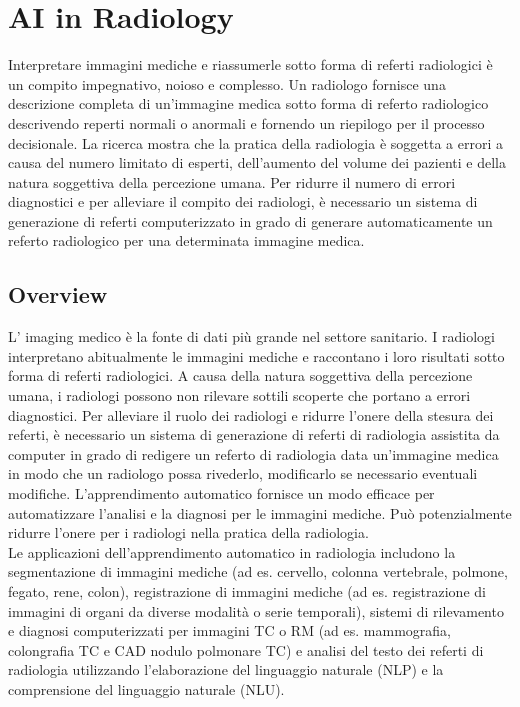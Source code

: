 \documentclass[12pt,a4paper]{report}
\begin{document}
\chapter{AI in Radiology}
Interpretare immagini mediche e riassumerle sotto forma di referti radiologici è un compito impegnativo, noioso e complesso. Un radiologo fornisce una descrizione completa di un'immagine medica sotto forma di referto radiologico descrivendo reperti normali o anormali e fornendo un riepilogo per il processo decisionale. La ricerca mostra che la pratica della radiologia è soggetta a errori a causa del numero limitato di esperti, dell'aumento del volume dei pazienti e della natura soggettiva della percezione umana. Per ridurre il numero di errori diagnostici e per alleviare il compito dei radiologi, è necessario un sistema di generazione di referti computerizzato in grado di generare automaticamente un referto radiologico per una determinata immagine medica.

\section{Overview}
L’ imaging medico è la fonte di dati più grande nel settore sanitario. 
I radiologi interpretano abitualmente le immagini mediche e raccontano i loro risultati sotto forma di referti radiologici. A causa della natura soggettiva della percezione umana, i radiologi possono non rilevare sottili scoperte che portano a errori diagnostici.
Per alleviare il ruolo dei radiologi e ridurre l'onere della stesura dei referti, è necessario un sistema di generazione di referti di radiologia assistita da computer in grado di redigere un referto di radiologia data un'immagine medica in modo che un radiologo possa rivederlo, modificarlo se necessario eventuali modifiche.
L'apprendimento automatico fornisce un modo efficace per automatizzare l'analisi e la diagnosi per le immagini mediche. Può potenzialmente ridurre l'onere per i radiologi nella pratica della radiologia.\\
Le applicazioni dell'apprendimento automatico in radiologia includono la segmentazione di immagini mediche (ad es. cervello, colonna vertebrale, polmone, fegato, rene, colon), registrazione di immagini mediche (ad es. registrazione di immagini di organi da diverse modalità o serie temporali), sistemi di rilevamento e diagnosi computerizzati per immagini TC o RM (ad es. mammografia, colongrafia TC e CAD nodulo polmonare TC) e analisi del testo dei referti di radiologia utilizzando l'elaborazione del linguaggio naturale (NLP) e la comprensione del linguaggio naturale (NLU).
\end{document}
